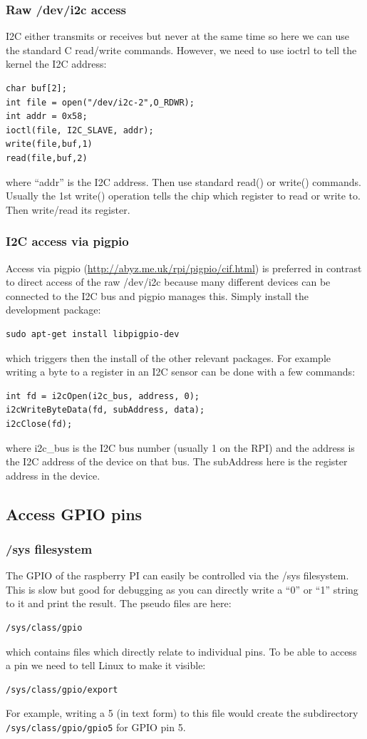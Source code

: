 \documentclass[12pt]{report}
\begin{document}
\subsubsection{Raw /dev/i2c access}
I2C either transmits or receives but never at the same time so here we
can use the standard C read/write commands. However, we need to use ioctrl to tell
the kernel the I2C address:
\begin{verbatim}
char buf[2];
int file = open("/dev/i2c-2",O_RDWR);
int addr = 0x58;
ioctl(file, I2C_SLAVE, addr);
write(file,buf,1)
read(file,buf,2)
\end{verbatim}
where ``addr'' is the I2C address. Then use standard read()
or write() commands. Usually the 1st write() operation tells the chip
which register to read or write to. Then write/read its register.

\subsubsection{I2C access via pigpio}
Access via pigpio (\url{http://abyz.me.uk/rpi/pigpio/cif.html})
is preferred in contrast to direct
access of the raw /dev/i2c because many different devices
can be connected to the I2C bus and pigpio manages this.
Simply install the development package:
\begin{verbatim}
sudo apt-get install libpigpio-dev
\end{verbatim}
which triggers then the install of the other relevant packages.
For example writing a byte to a register in an I2C sensor can be done with a
few commands:
\begin{verbatim}
int fd = i2cOpen(i2c_bus, address, 0);
i2cWriteByteData(fd, subAddress, data);
i2cClose(fd);
\end{verbatim}
where i2c\_bus is the I2C bus number (usually 1 on the RPI)
and the address is the I2C address of the device on that bus.
The subAddress here is the register address in the device.

\subsection{Access GPIO pins}
\subsubsection{/sys filesystem}
The GPIO of the raspberry PI can easily be controlled via
the /sys filesystem. This is slow but good for
debugging as you can directly write a
``0'' or ``1'' string to it and print the result. The
pseudo files are here:
\begin{verbatim}
/sys/class/gpio
\end{verbatim}
which contains files which directly relate to individual pins.
To be able to access a pin we need to tell Linux to make
it visible:
\begin{verbatim}
/sys/class/gpio/export
\end{verbatim}
For example, writing a 5 (in text form) to this file would
create the subdirectory \texttt{/sys/class/gpio/gpio5} for GPIO pin 5.
\end{document}
